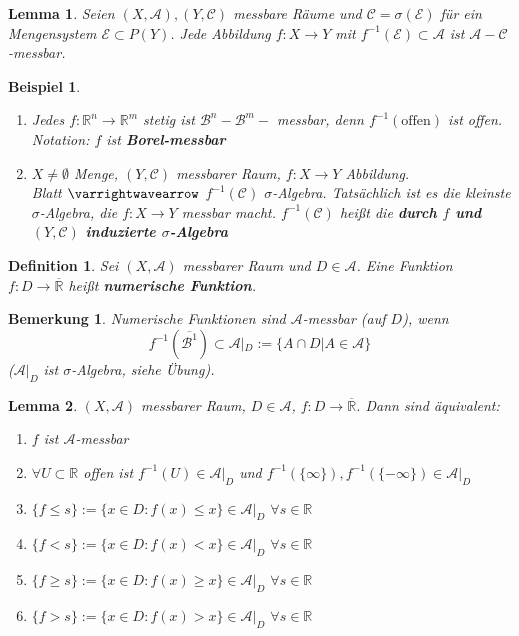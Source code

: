 \documentclass[11pt]{memoir}
\theoremstyle{changebreak}
\newtheorem{Definition}{Definition}[chapter]
\newtheorem{Bemerkung}{Bemerkung}[chapter]
\newtheorem{Beispiel}{Beispiel}[chapter]
\newtheorem{Lemma}{Lemma}[chapter]
\begin{document}
\begin{Lemma}
Seien $(X, \mathscr{A}), (Y, \mathscr{C})$ messbare Räume und $\mathscr{C} = \sigma(\mathscr E)$ für ein Mengensystem $\mathscr E \subset P(Y)$. Jede Abbildung $f: X \rightarrow Y$ mit $f^{-1}(\mathscr E) \subset \mathscr{A}$ ist $\mathscr{A}-\mathscr{C}$-messbar.
\end{Lemma}

\begin{Beispiel}
\begin{enumerate}
	\item Jedes $f: \mathbb{R}^n \rightarrow \mathbb{R}^m$ stetig ist $\mathscr{B}^n-\mathscr{B}^m-$ messbar, denn $f^{-1}(\text{offen})$ ist offen. \\
	\emph{Notation}: $f$ ist \textbf{Borel-messbar}
	\item $X \ne \emptyset$ Menge, $(Y, \mathscr{C})$ messbarer Raum, $f: X \rightarrow Y$ Abbildung. \\
	Blatt $\varrightwavearrow$ $f^{-1}(\mathscr{C})$ $\sigma$-Algebra. Tatsächlich ist es die kleinste $\sigma$-Algebra, die $f: X \rightarrow Y$ messbar macht. $f^{-1}(\mathscr{C})$ heißt die \textbf{durch $f$ und $(Y, \mathscr{C})$ induzierte $\sigma$-Algebra}
\end{enumerate}
\end{Beispiel}

\begin{Definition}
Sei $(X, \mathscr{A})$ messbarer Raum und $D \in \mathscr{A}$. Eine Funktion $f: D \rightarrow \overline{\mathbb{R}}$ heißt \textbf{numerische Funktion}.
\end{Definition}

\begin{Bemerkung}
Numerische Funktionen sind $\mathscr{A}$-messbar (auf $D$), wenn $$f^{-1}(\overline{\mathscr{B}^1}) \subset \mathscr{A}|_D:= \{A \cap D |A \in \mathscr{A}\}$$ 
($\mathscr A | _D$ ist $\sigma$-Algebra, siehe Übung).
\end{Bemerkung}

\begin{Lemma}
$(X, \mathscr A)$ messbarer Raum, $D \in \mathscr A$, $f: D \rightarrow \overline {\mathbb R}$. Dann sind äquivalent:
\begin{enumerate}
	\item $f$ ist $\mathscr A$-messbar
	\item $\forall U \subset \mathbb R$ offen ist $f^{-1}(U) \in \mathscr A |_D$ und $f^{-1}(\{\infty\}), f^{-1}(\{-\infty\}) \in \mathscr A |_D$
	\item $\{f \leq s\} := \{x \in D: f(x) \leq x\} \in \mathscr A |_D$ $ \forall s \in \mathbb R$
	\item $\{f < s\} := \{x \in D: f(x) < x\} \in \mathscr A |_D$ $ \forall s \in \mathbb R$
	\item $\{f \geq s\} := \{x \in D: f(x) \geq x\} \in \mathscr A |_D$ $ \forall s \in \mathbb R$
	\item $\{f > s\} := \{x \in D: f(x) > x\} \in \mathscr A |_D$ $ \forall s \in \mathbb R$
\end{enumerate}
\end{Lemma}
\end{document}
